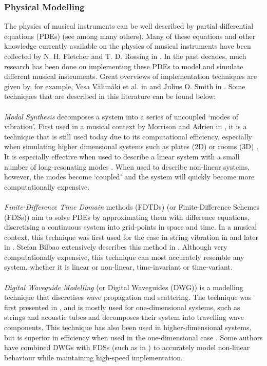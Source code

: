 \subsubsection*{Physical Modelling}
The physics of musical instruments can be well described by partial differential equations (PDEs) (see \cite{Bilbao2009} among many others). Many of these equations and other knowledge currently available on the physics of musical instruments have been collected by N. H. Fletcher and T. D. Rossing in \cite{Fletcher1998}. In the past decades, much research has been done on implementing these PDEs to model and simulate different musical instruments. Great overviews of implementation techniques are given by, for example, Vesa Välimäki et al. in \cite{Valimaki2006} and Julius O. Smith in \cite{Smith2010a, Smith2010b}. Some techniques that are described in this literature can be found below:
\\
\\
\emph{Modal Synthesis} decomposes a system into a series of uncoupled ‘modes of vibration’. First used in a musical context by Morrison and Adrien in \cite{Morrison1993}, it is a technique that is still used today due to its computational efficiency, especially when simulating higher dimensional systems such as plates (2D) or rooms (3D) . It is especially effective when used to describe a linear system \cite{Bilbao2018} with a small number of long-resonating modes \cite{Smith2010a}. When used to describe non-linear systems, however, the modes become `coupled’ and the system will quickly become more computationally expensive. 
\\
\\
\emph{Finite-Difference Time Domain} methods (FDTDs) (or Finite-Difference Schemes (FDSs)) aim to solve PDEs by approximating them with difference equations, discretising a continuous system into grid-points in space and time. In a musical context, this technique was first used for the case in string vibration in \cite{Ruiz1969, Hiller1971I, Hiller1971II} and later in \cite{Chaigne1992, Chaigne1994}. Stefan Bilbao extensively describes this method in \cite{Bilbao2009, Bilbao2018}. Although very computationally expensive, this technique can most accurately resemble any system, whether it is linear or non-linear, time-invariant or time-variant.
\\
\\
\emph{Digital Waveguide Modelling} (or Digital Waveguides (DWG)) is a modelling technique that discretises wave propagation and scattering. The technique was first presented in \cite{Smith1992}, and is mostly used for one-dimensional systems, such as strings and acoustic tubes and decomposes their system into travelling wave components. This technique has also been used in higher-dimensional systems, but is superior in efficiency when used in the one-dimensional case \cite{Valimaki2006}. Some authors have combined DWGs with FDSs (such as in \cite{Erkut2002, Maestre2014}) to accurately model non-linear behaviour while maintaining high-speed implementation.
